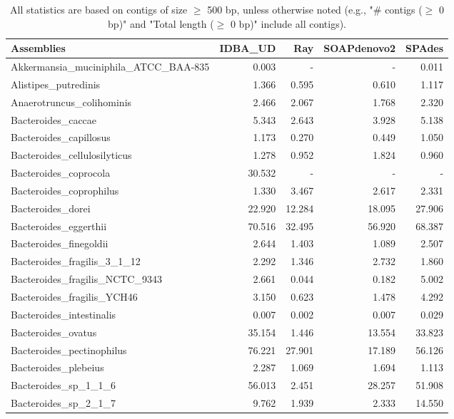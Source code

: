 \documentclass[12pt,a4paper]{article}
\begin{document}
\begin{table}[ht]
\begin{center}
\caption{All statistics are based on contigs of size $\geq$ 500 bp, unless otherwise noted (e.g., "\# contigs ($\geq$ 0 bp)" and "Total length ($\geq$ 0 bp)" include all contigs).}
\begin{tabular}{|l*{4}{|r}|}
\hline
Assemblies & IDBA\_UD & Ray & SOAPdenovo2 & SPAdes \\ \hline
Akkermansia\_muciniphila\_ATCC\_BAA-835 & 0.003 & - & - & 0.011 \\ \hline
Alistipes\_putredinis & 1.366 & 0.595 & 0.610 & 1.117 \\ \hline
Anaerotruncus\_colihominis & 2.466 & 2.067 & 1.768 & 2.320 \\ \hline
Bacteroides\_caccae & 5.343 & 2.643 & 3.928 & 5.138 \\ \hline
Bacteroides\_capillosus & 1.173 & 0.270 & 0.449 & 1.050 \\ \hline
Bacteroides\_cellulosilyticus & 1.278 & 0.952 & 1.824 & 0.960 \\ \hline
Bacteroides\_coprocola & 30.532 & - & - & - \\ \hline
Bacteroides\_coprophilus & 1.330 & 3.467 & 2.617 & 2.331 \\ \hline
Bacteroides\_dorei & 22.920 & 12.284 & 18.095 & 27.906 \\ \hline
Bacteroides\_eggerthii & 70.516 & 32.495 & 56.920 & 68.387 \\ \hline
Bacteroides\_finegoldii & 2.644 & 1.403 & 1.089 & 2.507 \\ \hline
Bacteroides\_fragilis\_3\_1\_12 & 2.292 & 1.346 & 2.732 & 1.860 \\ \hline
Bacteroides\_fragilis\_NCTC\_9343 & 2.661 & 0.044 & 0.182 & 5.002 \\ \hline
Bacteroides\_fragilis\_YCH46 & 3.150 & 0.623 & 1.478 & 4.292 \\ \hline
Bacteroides\_intestinalis & 0.007 & 0.002 & 0.007 & 0.029 \\ \hline
Bacteroides\_ovatus & 35.154 & 1.446 & 13.554 & 33.823 \\ \hline
Bacteroides\_pectinophilus & 76.221 & 27.901 & 17.189 & 56.126 \\ \hline
Bacteroides\_plebeius & 2.287 & 1.069 & 1.694 & 1.113 \\ \hline
Bacteroides\_sp\_1\_1\_6 & 56.013 & 2.451 & 28.257 & 51.908 \\ \hline
Bacteroides\_sp\_2\_1\_7 & 9.762 & 1.939 & 2.333 & 14.550 \\ \hline

\end{tabular}
\end{center}
\end{table}
\end{document}
